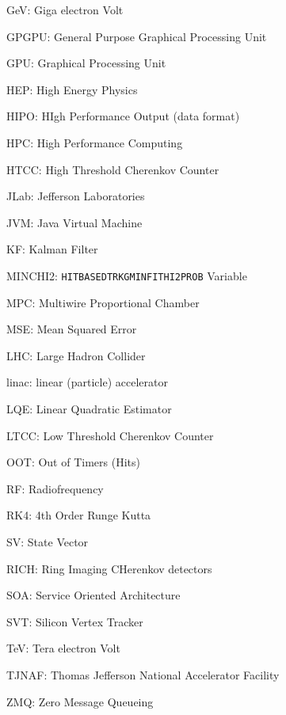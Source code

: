 {    GeV: Giga electron Volt
    
    GPGPU: General Purpose Graphical Processing Unit
    
    GPU: Graphical Processing Unit
    
    HEP: High Energy Physics

    HIPO: HIgh Performance Output (data format)
    
    HPC: High Performance Computing
    
    HTCC: High Threshold Cherenkov Counter
    
    JLab: Jefferson Laboratories
    
    JVM: Java Virtual Machine
    
    KF: Kalman Filter
    
    MINCHI2: \texttt{HITBASEDTRKGMINFITHI2PROB} Variable
    
    MPC: Multiwire Proportional Chamber
    
    MSE: Mean Squared Error
    
    LHC: Large Hadron Collider
    
    linac: linear (particle) accelerator
    
    LQE: Linear Quadratic Estimator
    
    LTCC: Low Threshold Cherenkov Counter
    
    OOT: Out of Timers (Hits)
    
    RF: Radiofrequency
    
    RK4: 4th Order Runge Kutta
    
    SV: State Vector
    
    RICH: Ring Imaging CHerenkov detectors
    
    SOA: Service Oriented Architecture

    SVT: Silicon Vertex Tracker
        
    TeV: Tera electron Volt
    
    TJNAF: Thomas Jefferson National Accelerator Facility
    
    ZMQ: Zero Message Queueing
}
